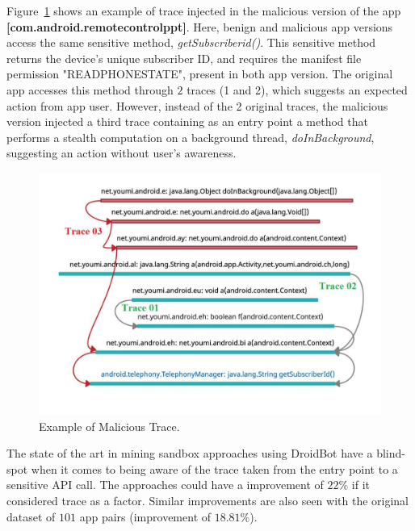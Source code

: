 Figure~\ref{fig:maliciousTrace} shows an example of trace injected in the malicious version of the app \textbf{[com.android.remotecontrolppt]}. Here, benign and malicious app versions access the same sensitive method, \textit{getSubscriberid()}. This sensitive method returns the device's unique subscriber ID, and requires the manifest file permission "READ\underline{\space}PHONE\underline{\space}STATE", present in both app version. The original app accesses this method through $2$ traces (1 and 2), which suggests an expected action from app user. However, instead of the 2 original traces, the malicious version injected a third trace containing as an entry point a method that performs a stealth computation on a background thread, \textit{doInBackground}, suggesting an action without user's awareness.

\begin{figure}
\centering
\includegraphics[scale=0.28]{images/maliciousTrace_example01.pdf}
\caption{Example of Malicious Trace.}
 \label{fig:maliciousTrace}
\end{figure}

\begin{obs}{2}{}
 The state of the art in mining sandbox approaches using DroidBot have a blind-spot when it comes to being aware of the trace taken from the entry point to a sensitive API call. The approaches could have a improvement of $22\%$ if it considered trace as a factor. Similar  improvements are also seen with the original dataset of $101$ app pairs (improvement of $18.81\%$).
 \end{obs}

